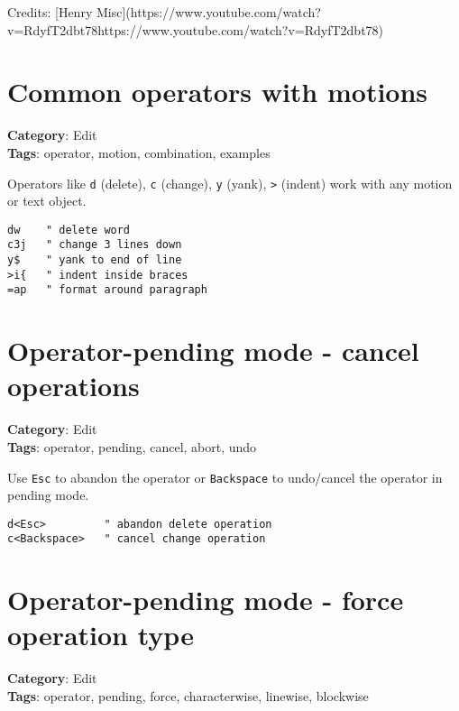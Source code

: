 {{{Credits: [Henry Misc](https://www.youtube.com/watch?v=RdyfT2dbt78https://www.youtube.com/watch?v=RdyfT2dbt78)

\section{Common operators with motions}

\textbf{Category}: Edit\\ \textbf{Tags}: operator, motion, combination, examples
\vspace{0.5cm}

Operators like {\footnotesize \Verb§d§} (delete), {\footnotesize \Verb§c§} (change), {\footnotesize \Verb§y§} (yank), {\footnotesize \Verb§>§} (indent) work with any motion or text object.

\begin{Exa*}{}
\begin{Verbatim}[fontsize=\footnotesize, breaklines, breakanywhere]
dw    " delete word
c3j   " change 3 lines down
y$    " yank to end of line
>i{   " indent inside braces
=ap   " format around paragraph
\end{Verbatim}
\end{Exa*}

\section{Operator-pending mode - cancel operations}

\textbf{Category}: Edit\\ \textbf{Tags}: operator, pending, cancel, abort, undo
\vspace{0.5cm}

Use {\footnotesize \Verb§Esc§} to abandon the operator or {\footnotesize \Verb§Backspace§} to undo/cancel the operator in pending mode.

\begin{Exa*}{}
\begin{Verbatim}[fontsize=\footnotesize, breaklines, breakanywhere]
d<Esc>         " abandon delete operation
c<Backspace>   " cancel change operation
\end{Verbatim}
\end{Exa*}

\section{Operator-pending mode - force operation type}

\textbf{Category}: Edit\\ \textbf{Tags}: operator, pending, force, characterwise, linewise, blockwise
\vspace{0.5cm}

}}}
